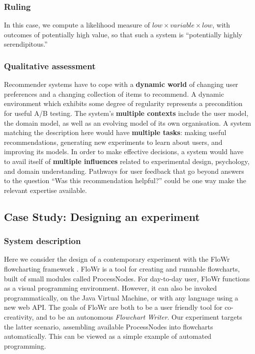 \subsubsection{Ruling}

In this case, we compute a likelihood measure of
$\mathit{low}\times\mathit{variable}\times\mathit{low}$, with outcomes
of potentially high value, so that such a system is ``potentially
highly serendipitous.''

\subsubsection{Qualitative assessment}

Recommender systems have to cope with a \textbf{dynamic world} of changing user preferences and a changing collection of items to recommend.  A dynamic environment which exhibits some degree of regularity represents a precondition for useful A/B testing.  The system's \textbf{multiple contexts} include the user model, the domain model, as well as an evolving model of its own organisation.  A system matching the description here would have \textbf{multiple tasks}: making useful recommendations, generating new experiments to learn about users, and improving its models.  In order to make effective decisions, a system would have to avail itself of \textbf{multiple influences} related to experimental design, psychology, and domain understanding.  Pathways for user feedback that go beyond answers to the question ``Was this recommendation helpful?'' could be one way make the relevant expertise available.

\subsection{Case Study: Designing an experiment} \label{sec:flowchartassembly}

\subsubsection{System description}

Here we consider the design of a contemporary experiment with the
{\sf FloWr} flowcharting framework \cite{colton-flowcharting}.  {\sf FloWr} is a
tool for creating and runnable flowcharts, built of small
modules called ProcessNodes.  For day-to-day user, {\sf FloWr} functions as a visual programming environment.  However, it can also be invoked programmatically, on the Java Virtual Machine, or with any language
using a new web API.  The goals of {\sf FloWr} are both to be a user
friendly tool for co-creativity, and to be an autonomous
\emph{Flowchart Writer}.  Our experiment targets the latter scenario,
assembling available ProcessNodes into flowcharts automatically.  This can be viewed as a simple example of automated programming.

